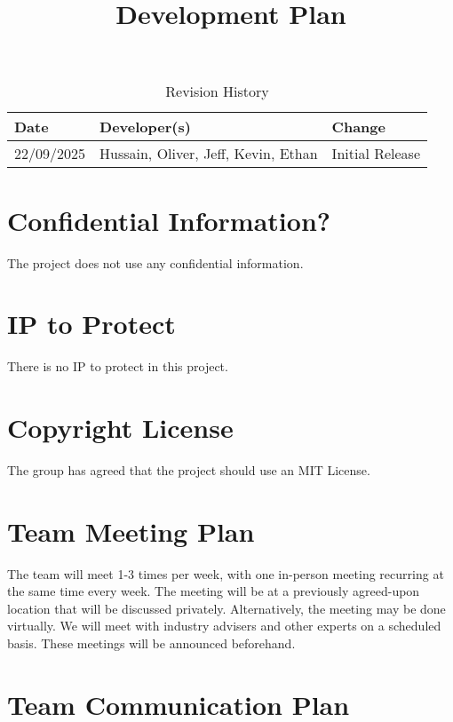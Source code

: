 \documentclass{article}
\title{Development Plan\\\progname}
\author{\authname}
\date{}
\begin{document}
\maketitle

\begin{table}[hp]
\caption{Revision History} \label{TblRevisionHistory}
\begin{tabularx}{\textwidth}{llX}
\toprule
\textbf{Date} & \textbf{Developer(s)} & \textbf{Change}\\
\midrule
22/09/2025 & Hussain, Oliver, Jeff, Kevin, Ethan & Initial Release\\
\bottomrule
\end{tabularx}
\end{table}

\newpage{}

\section{Confidential Information?}

The project does not use any confidential information. 

\section{IP to Protect}

There is no IP to protect in this project. 


\section{Copyright License}

The group has agreed that the project should use an MIT License.


\section{Team Meeting Plan}


The team will meet 1-3 times per week, with one in-person meeting recurring at 
the same time every week. The meeting will be at a previously agreed-upon 
location that will be discussed privately. Alternatively, the meeting may be 
done virtually. We will meet with industry advisers and  other experts on a 
scheduled basis. These meetings will be announced beforehand. 

\section{Team Communication Plan}
\end{document}
